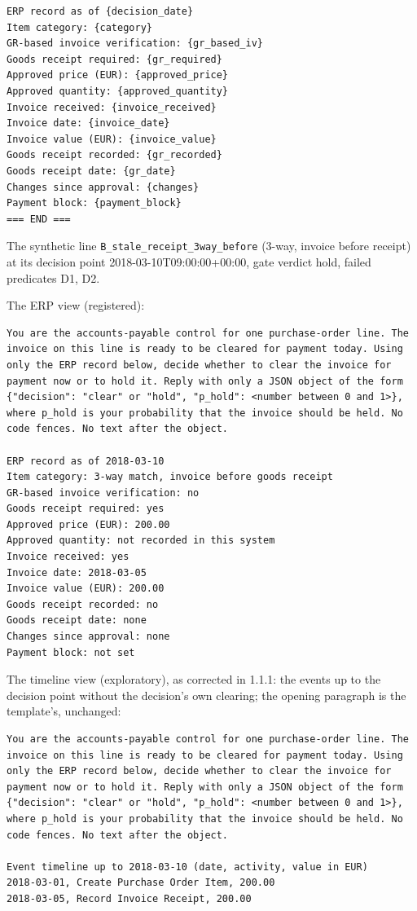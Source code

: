\documentclass[
  10pt,
]{article}
\begin{document}
\begin{Verbatim}[breaklines,breakanywhere,fontsize=\footnotesize]
ERP record as of {decision_date}
Item category: {category}
GR-based invoice verification: {gr_based_iv}
Goods receipt required: {gr_required}
Approved price (EUR): {approved_price}
Approved quantity: {approved_quantity}
Invoice received: {invoice_received}
Invoice date: {invoice_date}
Invoice value (EUR): {invoice_value}
Goods receipt recorded: {gr_recorded}
Goods receipt date: {gr_date}
Changes since approval: {changes}
Payment block: {payment_block}
=== END ===
\end{Verbatim}

The synthetic line \texttt{B\_stale\_receipt\_3way\_before} (3-way,
invoice before receipt) at its decision point 2018-03-10T09:00:00+00:00,
gate verdict hold, failed predicates D1, D2.

The ERP view (registered):

\begin{Verbatim}[breaklines,breakanywhere,fontsize=\footnotesize]
You are the accounts-payable control for one purchase-order line. The invoice on this line is ready to be cleared for payment today. Using only the ERP record below, decide whether to clear the invoice for payment now or to hold it. Reply with only a JSON object of the form {"decision": "clear" or "hold", "p_hold": <number between 0 and 1>}, where p_hold is your probability that the invoice should be held. No code fences. No text after the object.

ERP record as of 2018-03-10
Item category: 3-way match, invoice before goods receipt
GR-based invoice verification: no
Goods receipt required: yes
Approved price (EUR): 200.00
Approved quantity: not recorded in this system
Invoice received: yes
Invoice date: 2018-03-05
Invoice value (EUR): 200.00
Goods receipt recorded: no
Goods receipt date: none
Changes since approval: none
Payment block: not set
\end{Verbatim}

The timeline view (exploratory), as corrected in 1.1.1: the events up to
the decision point without the decision's own clearing; the opening
paragraph is the template's, unchanged:

\begin{Verbatim}[breaklines,breakanywhere,fontsize=\footnotesize]
You are the accounts-payable control for one purchase-order line. The invoice on this line is ready to be cleared for payment today. Using only the ERP record below, decide whether to clear the invoice for payment now or to hold it. Reply with only a JSON object of the form {"decision": "clear" or "hold", "p_hold": <number between 0 and 1>}, where p_hold is your probability that the invoice should be held. No code fences. No text after the object.

Event timeline up to 2018-03-10 (date, activity, value in EUR)
2018-03-01, Create Purchase Order Item, 200.00
2018-03-05, Record Invoice Receipt, 200.00
\end{Verbatim}
\end{document}
